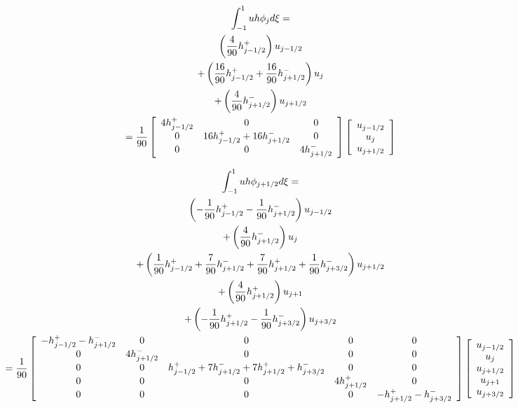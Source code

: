\documentclass[12pt]{article}
\begin{document}
\newpage

\begin{landscape}
	\begin{multline*}
\int_{-1}^{1} uh \phi_{j}d \xi =  \\
\left( \frac{4}{90}h^+ _{j - 1/2} \right) u_{j - 1/2} \\
+ \left(\frac{16}{90}h^+ _{j - 1/2} +  \frac{16}{90} h^- _{j + 1/2} \right) u_{j} \\
+ \left( \frac{4}{90}h^- _{j + 1/2} \right) u_{j + 1/2}  \\
	= \frac{1}{90} \left[\begin{array}{c c c}
	4 h^+ _{j - 1/2} & 0 & 0\\
	0 &  16h^+ _{j - 1/2} +  16 h^- _{j + 1/2} & 0 \\
	0 & 0 & 4h^- _{j + 1/2}\\
	 \end{array}\right] 
	\left[\begin{array}{c}u_{j-1/2} \\ u_{j} \\ u_{j+1/2} \end{array}\right]
	\end{multline*}
\end{landscape}
 
 \newpage
\begin{landscape}
	\begin{multline*}
	\int_{-1}^{1} uh \phi_{j+1/2}d \xi = \\
	\left(-\frac{1}{90}h^+ _{j - 1/2} -\frac{1}{90} h^- _{j + 1/2} \right) u_{j - 1/2}\\
	+  \left( \frac{4}{90}h^- _{j + 1/2} \right) u_{j}\\
	+ \left(\frac{1}{90}h^+ _{j - 1/2} + \frac{7}{90}h^- _{j + 1/2} + \frac{7}{90}h^+ _{j + 1/2} + \frac{1}{90}h^- _{j + 3/2} \right) u_{j + 1/2} \\
	+ \left(\frac{4}{90}h^+ _{j + 1/2} \right) u_{j + 1}\\
	+ \left( -\frac{1}{90}h^+ _{j + 1/2} -\frac{1}{90} h^- _{j + 3/2} \right) u_{j + 3/2} \\
	= \frac{1}{90} \left[\begin{array}{c c c c c}
	-h^+ _{j - 1/2} -h^- _{j + 1/2}  & 0 & 0 &0 &0  \\
	0 &4h^- _{j + 1/2} & 0 & 0 &0\\
	0 & 0 &h^+ _{j - 1/2} + 7h^- _{j + 1/2} + 7h^+ _{j + 1/2} +h^- _{j + 3/2} & 0 & 0 \\ 
	0 & 0 & 0 & 4 h^+ _{j + 1/2} & 0 \\ 
	0 & 0 & 0 & 0 &-h^+ _{j + 1/2} - h^- _{j + 3/2}  \end{array}\right] 
	\left[\begin{array}{c}u_{j-1/2} \\u_{j}\\u_{j+1/2} \\ u_{j+1} \\ u_{j+3/2} \end{array}\right]
	\end{multline*}
	 
\end{landscape}
\end{document}
